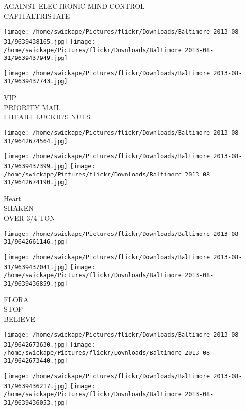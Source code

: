 \documentclass[10pt,letterpaper]{article}
\begin{document}
AGAINST ELECTRONIC MIND CONTROL\\
CAPITALTRISTATE\\
\pagebreak

\texttt{[image: /home/swickape/Pictures/flickr/Downloads/Baltimore 2013-08-31/9639438165.jpg]}
\texttt{[image: /home/swickape/Pictures/flickr/Downloads/Baltimore 2013-08-31/9639437949.jpg]}

\texttt{[image: /home/swickape/Pictures/flickr/Downloads/Baltimore 2013-08-31/9639437743.jpg]}

VIP\\
PRIORITY MAIL\\
I HEART LUCKIE'S NUTS\\
\pagebreak

\texttt{[image: /home/swickape/Pictures/flickr/Downloads/Baltimore 2013-08-31/9642674564.jpg]}

\vspace{0.25in}
\texttt{[image: /home/swickape/Pictures/flickr/Downloads/Baltimore 2013-08-31/9639437399.jpg]}
\texttt{[image: /home/swickape/Pictures/flickr/Downloads/Baltimore 2013-08-31/9642674190.jpg]}

Heart\\
SHAKEN\\
OVER 3/4 TON\\
\pagebreak

\texttt{[image: /home/swickape/Pictures/flickr/Downloads/Baltimore 2013-08-31/9642661146.jpg]}

\vspace{0.25in}
\texttt{[image: /home/swickape/Pictures/flickr/Downloads/Baltimore 2013-08-31/9639437041.jpg]}
\texttt{[image: /home/swickape/Pictures/flickr/Downloads/Baltimore 2013-08-31/9639436859.jpg]}

FLORA\\
STOP\\
BELIEVE\\
\pagebreak

\texttt{[image: /home/swickape/Pictures/flickr/Downloads/Baltimore 2013-08-31/9642673630.jpg]}
\texttt{[image: /home/swickape/Pictures/flickr/Downloads/Baltimore 2013-08-31/9642673440.jpg]}

\texttt{[image: /home/swickape/Pictures/flickr/Downloads/Baltimore 2013-08-31/9639436217.jpg]}
\texttt{[image: /home/swickape/Pictures/flickr/Downloads/Baltimore 2013-08-31/9639436053.jpg]}
\end{document}
